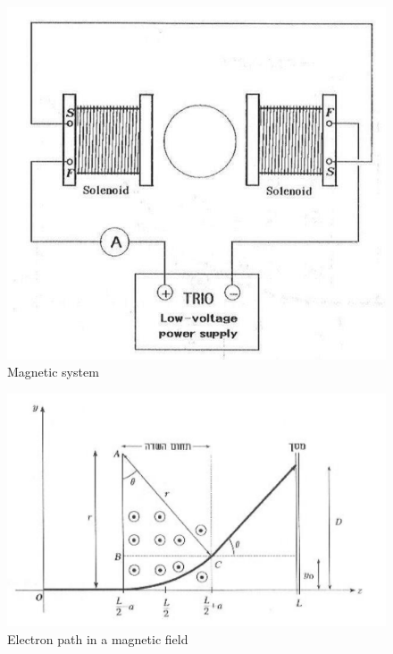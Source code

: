 \documentclass[12pt]{article}
\begin{document}
\begin{figure}[H]
  \centering
  \includegraphics[width=0.5\linewidth]{magnetic system.png}
  \caption{Magnetic system}
  \label{fig:magnetic_system}
\end{figure}

\begin{figure}[H]
  \centering
  \includegraphics[width=0.5\linewidth]{electron path in a magnetic field.png}
  \caption{Electron path in a magnetic field}
  \label{fig:electron_path}
\end{figure}
\end{document}

